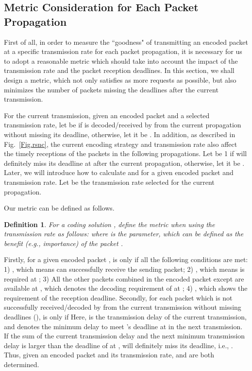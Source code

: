 \documentclass[journal]{IEEEtran}
\newtheorem{DD}{Definition}
\begin{document}
\subsection{Metric Consideration for Each Packet Propagation}\vspace{-0.03in}
First of all, in order to measure the ``goodness" of transmitting an encoded packet at a specific transmission rate for each packet propagation, it is necessary for us to adopt a reasonable metric which should take into account the impact of the transmission rate and the packet reception deadlines.
In this section, we shall design a metric, which not only satisfies as more requests as possible, but also minimizes the number of packets missing the deadlines after the current transmission.

For the current transmission, given an encoded packet and a selected transmission rate, let  be  if  is decoded/received by  from the current propagation without missing its deadline, otherwise, let it be . In addition, as described in Fig.~\ref{Fig.rsnc}, the current encoding strategy and transmission rate also affect the timely receptions of the packets in the following propagations. Let  be 1 if  will definitely miss its deadline at  after the current propagation, otherwise, let it be . Later, we will introduce how to calculate  and  for a given encoded packet and transmission rate. Let  be the transmission rate selected for the current propagation.

Our metric can be defined as follows.
\begin{DD}
For a coding solution , define the metric  when using the transmission rate  as follows:
\vspace{-0.05in}
{\small}
where  is the parameter, which can be defined as the benefit (e.g., importance) of the packet .
\end{DD}\vspace{-0.05in}

Firstly, for a given encoded packet ,  is  only if all the following conditions are met: 1) , which means  can successfully receive the sending packet; 2) , which means  is required at ; 3) All the other packets combined in the encoded packet except  are available at , which denotes the decoding requirement of  at ; 4) , which shows the requirement of the reception deadline.
Secondly, for each packet  which is not successfully received/decoded by  from the current transmission without missing deadlines (),  is  only if
{\small }
Here,  is the transmission delay of the current transmission, and  denotes the minimum delay to meet 's deadline at  in the next transmission. If the sum of the current transmission delay and the next minimum transmission delay is larger than the deadline of  at ,  will definitely miss its deadline, i.e., .
Thus, given an encoded packet and its transmission rate,  and  are both determined.
\end{document}
